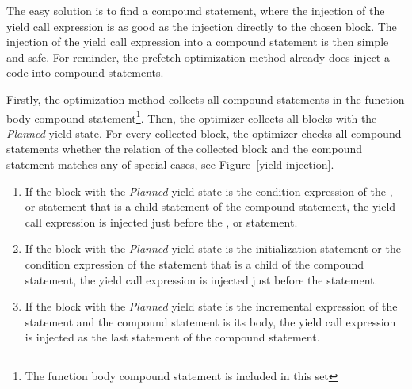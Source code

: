 The easy solution is to find a compound statement, where the injection of the yield call expression is as good as the injection directly to the chosen block. The injection of the yield call expression into a compound statement is then simple and safe. For reminder, the prefetch optimization method already does inject a code into compound statements.

Firstly, the optimization method collects all compound statements in the function body compound statement\footnote{The function body compound statement is included in this set}. Then, the optimizer collects all blocks with the \emph{Planned} yield state. For every collected block, the optimizer checks all compound statements whether the relation of the collected block and the compound statement matches any of special cases, see Figure~\ref{yield-injection}.

\begin{enumerate}
\item{If the block with the \emph{Planned} yield state is the condition expression of the ,  or  statement that is a child statement of the compound statement, the yield call expression is injected just before the ,  or  statement.}
\item{If the block with the \emph{Planned} yield state is the initialization statement or the condition expression of the  statement that is a child of the compound statement, the yield call expression is injected just before the  statement.}
\item{If the block with the \emph{Planned} yield state is the incremental expression of the  statement and the compound statement is its body, the yield call expression is injected as the last statement of the compound statement.}
\end{enumerate}

